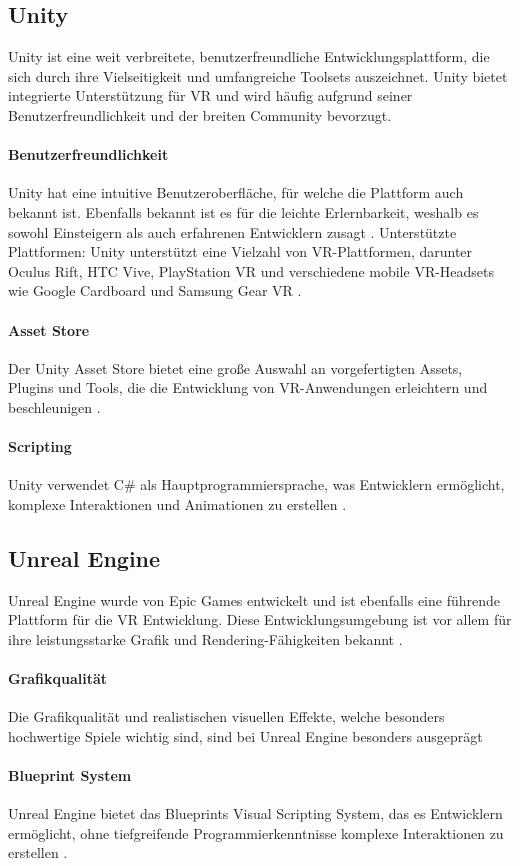 \subsection{Unity}
Unity ist eine weit verbreitete, benutzerfreundliche Entwicklungsplattform, die sich durch ihre Vielseitigkeit und umfangreiche Toolsets auszeichnet. Unity bietet integrierte Unterstützung für VR und wird häufig aufgrund seiner Benutzerfreundlichkeit und der breiten Community bevorzugt.
\paragraph{Benutzerfreundlichkeit}
Unity hat eine intuitive Benutzeroberfläche, für welche die Plattform auch bekannt ist. Ebenfalls bekannt ist es für die leichte Erlernbarkeit, weshalb es sowohl Einsteigern als auch erfahrenen Entwicklern zusagt \cite{unity2021}.
Unterstützte Plattformen: Unity unterstützt eine Vielzahl von VR-Plattformen, darunter Oculus Rift, HTC Vive, PlayStation VR und verschiedene mobile VR-Headsets wie Google Cardboard und Samsung Gear VR \cite{unity2021}.
\paragraph{Asset Store}
Der Unity Asset Store bietet eine große Auswahl an vorgefertigten Assets, Plugins und Tools, die die Entwicklung von VR-Anwendungen erleichtern und beschleunigen \cite{unityAssetStore2021}.
\paragraph{Scripting}
Unity verwendet C\# als Hauptprogrammiersprache, was Entwicklern ermöglicht, komplexe Interaktionen und Animationen zu erstellen \cite{unity2021}.
\subsection{Unreal Engine}
Unreal Engine wurde von Epic Games entwickelt und ist ebenfalls eine führende Plattform für die VR Entwicklung. Diese Entwicklungsumgebung ist vor allem für ihre leistungsstarke Grafik und Rendering-Fähigkeiten bekannt .
\paragraph{Grafikqualität} Die Grafikqualität und realistischen visuellen Effekte, welche besonders hochwertige Spiele wichtig sind, sind bei Unreal Engine besonders ausgeprägt \cite{epic2021}
\paragraph{Blueprint System} Unreal Engine bietet das Blueprints Visual Scripting System, das es Entwicklern ermöglicht, ohne tiefgreifende Programmierkenntnisse komplexe Interaktionen zu erstellen \cite{epicBlueprints2021}.
